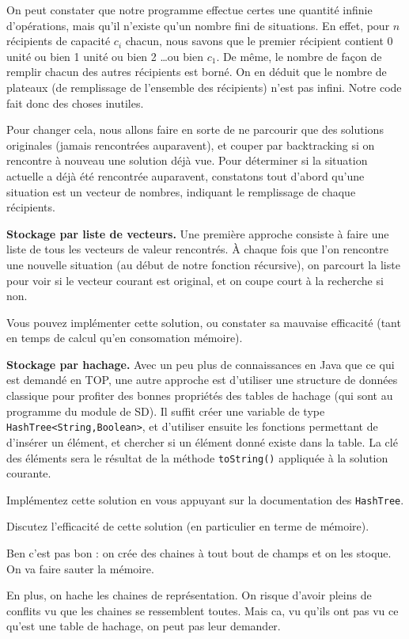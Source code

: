 \documentclass[10pt]{article}\usepackage[correction,nu]{esial}%
\begin{document}
On peut constater que notre programme effectue certes une quantité infinie
d'opérations, mais qu'il n'existe qu'un nombre fini de situations. En effet,
pour $n$ récipients de capacité $c_i$ chacun, nous savons que le premier
récipient contient 0 unité ou bien 1 unité ou bien 2 \ldots ou bien $c_1$. De
même, le nombre de façon de remplir chacun des autres récipients est borné. On
en déduit que le nombre de plateaux (de remplissage de l'ensemble des
récipients) n'est pas infini. Notre code fait donc des choses inutiles.

Pour changer cela, nous allons faire en sorte de ne parcourir que des solutions
originales (jamais rencontrées auparavent), et couper par backtracking si on
rencontre à nouveau une solution déjà vue. Pour déterminer si la situation
actuelle a déjà été rencontrée auparavent, constatons tout d'abord qu'une
situation est un vecteur de nombres, indiquant le remplissage de chaque
récipients.

\Exercice\textbf{Stockage par liste de vecteurs.} Une première approche
consiste à faire une liste de tous les vecteurs de valeur rencontrés. À chaque
fois que l'on rencontre une nouvelle situation (au début de notre fonction
récursive), on parcourt la liste pour voir si le vecteur courant est original,
et on coupe court à la recherche si non.

\Question Vous pouvez implémenter cette solution, ou constater sa mauvaise
efficacité (tant en temps de calcul qu'en consomation mémoire).

\Exercice \textbf{Stockage par hachage.} Avec un peu plus de connaissances en
Java que ce qui est demandé en TOP, une autre approche est d'utiliser une
structure de données classique pour profiter des bonnes propriétés des tables
de hachage (qui sont au programme du module de SD). Il suffit créer une
variable de type \texttt{HashTree<String,Boolean>}, et d'utiliser ensuite les
fonctions permettant de d'insérer un élément, et chercher si un élément donné
existe dans la table. La clé des éléments sera le résultat de la méthode
\texttt{toString()} appliquée à la solution courante. 

\Question Implémentez cette solution en vous appuyant sur la documentation des
\texttt{HashTree}.

\Question Discutez l'efficacité de cette solution (en particulier en terme de
mémoire).
\begin{Reponse}
  Ben c'est pas bon : on crée des chaines à tout bout de champs et on les
  stoque. On va faire sauter la mémoire. 

  En plus, on hache les chaines de représentation. On risque d'avoir pleins de
  conflits vu que les chaines se ressemblent toutes. Mais ca, vu qu'ils ont pas
  vu ce qu'est une table de hachage, on peut pas leur demander.
\end{Reponse}
\end{document}
